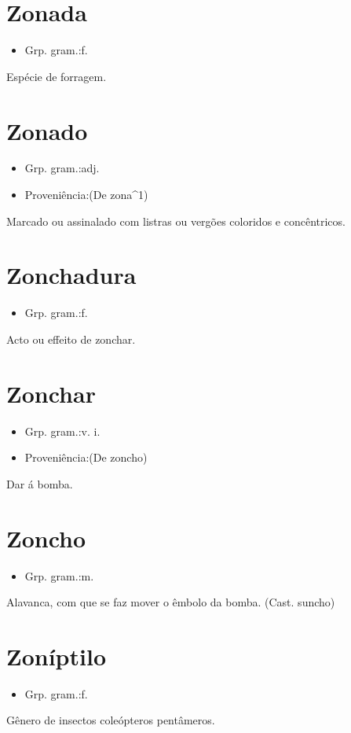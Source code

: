 \section{Zonada}
\begin{itemize}
\item {Grp. gram.:f.}
\end{itemize}
Espécie de forragem.
\section{Zonado}
\begin{itemize}
\item {Grp. gram.:adj.}
\end{itemize}
\begin{itemize}
\item {Proveniência:(De \textunderscore zona\textunderscore ^1)}
\end{itemize}
Marcado ou assinalado com listras ou vergões coloridos e concêntricos.
\section{Zonchadura}
\begin{itemize}
\item {Grp. gram.:f.}
\end{itemize}
Acto ou effeito de zonchar.
\section{Zonchar}
\begin{itemize}
\item {Grp. gram.:v. i.}
\end{itemize}
\begin{itemize}
\item {Proveniência:(De \textunderscore zoncho\textunderscore )}
\end{itemize}
Dar á bomba.
\section{Zoncho}
\begin{itemize}
\item {Grp. gram.:m.}
\end{itemize}
Alavanca, com que se faz mover o êmbolo da bomba.
(Cast. \textunderscore suncho\textunderscore )
\section{Zoníptilo}
\begin{itemize}
\item {Grp. gram.:f.}
\end{itemize}
Gênero de insectos coleópteros pentâmeros.

